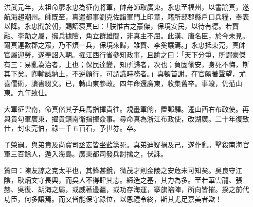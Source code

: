 \begin{pinyinscope}
洪武元年，太祖命廖永忠為征南將軍，帥舟師取廣東。永忠至福州，以書諭真，遂航海趨潮州。師既至，真遣都事劉克佐詣軍門上印章，籍所部郡縣戶口兵糧，奉表以降。永忠聞於朝，賜詔褒真曰：「朕惟古之豪傑，保境安民，以待有德。若竇融、李勣之屬，擁兵據險，角立群雄間，非真主不屈。此漢、唐名臣，於今未見。爾真連數郡之眾，乃不煩一兵，保境來歸，雖竇、李奚讓焉。」永忠抵東莞，真帥官屬迎勞，遂奉詔入朝。擢江西行省參知政事，且諭之曰：「天下分爭，所謂豪傑有三：易亂為治者，上也；保民達變，知所歸者，次也；負固偷安，身死不悔，斯其下矣。卿輸誠納土，不逆顏行，可謂識時務者。」真頓首謝。在官頗著聲望，尤喜儒術，讀書綴文。已，轉山東參政。四年命還廣東，收集舊卒。事竣，仍蒞山東。九年致仕。

大軍征雲南，命真偕其子兵馬指揮貴往。規畫軍餉，置郵驛。遷山西右布政使。再與貴勾軍廣東，擢貴鎮南衛指揮僉事。尋命真為浙江布政使，改湖廣。二十年復致仕，封東莞伯，祿一千五百石，予世券。卒。

子榮嗣。與弟貴及尚寶司丞宏皆坐藍黨死。真弟迪疑禍及己，遂作亂。擊殺南海官軍三百餘人，遁入海島。廣東都司發兵討擒之，伏誅。

贊曰：陳友諒之克太平也，其鋒甚銳，微茂才則金陵之安危未可知矣。吳良守江陰，耿炳文守長興，而吳人不得肆其志。締造之基，其力為多。至若華雲龍、張赫、吳復、胡海之屬，或威著邊疆，或功存海運，搴旗陷陣，所向皆摧。揆之前代功臣，何多讓焉。而又皆能保守祿位，以恩禮令終，斯其尤足嘉美者歟！


\end{pinyinscope}